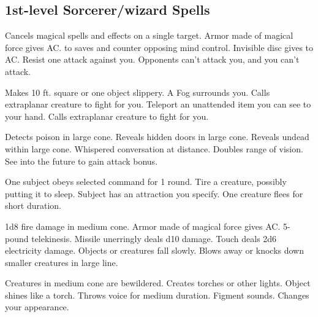 \subsection{1st-level Sorcerer/wizard Spells}
\begin{swspelllist}
 Cancels magical spells and effects on a single target.
 Armor made of magical force gives  AC.
  to saves and counter opposing mind control.
 Invisible disc gives  to AC.
 Resist one attack against you.
 Opponents can't attack you, and you can't attack.

 Makes 10 ft. square or one object slippery.
 A Fog surrounds you.
 Calls extraplanar creature to fight for you.
 Teleport an unattended item you can see to your hand.
 Calls extraplanar creature to fight for you.

 Detects poison in large cone.
 Reveals hidden doors in large cone.
 Reveals undead within large cone.
 Whispered conversation at distance.
 Doubles range of vision.
 See into the future to gain attack bonus.

 One subject obeys selected command for 1 round.
 Tire a creature, possibly putting it to sleep.
 Subject has an attraction you specify.
 One creature flees for short duration.

 1d8 fire damage in medium cone.
 Armor made of magical force gives  AC.
 5-pound telekinesis.
 Missile unerringly deals d10 damage.
 Touch deals 2d6 electricity damage.
 Objects or creatures fall slowly.
 Blows away or knocks down smaller creatures in large line.

 Creatures in medium cone are bewildered.
 Creates torches or other lights.
 Object shines like a torch.
 Throws voice for medium duration.
 Figment sounds.
 Changes your appearance.


\end{swspelllist}
